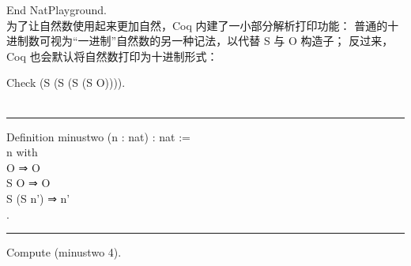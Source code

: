 \documentclass[utf8]{ctexart}
\begin{document}
{End} {NatPlayground}.\\

为了让自然数使用起来更加自然，Coq 内建了一小部分解析打印功能：
普通的十进制数可视为``一进制''自然数的另一种记法，以代替 {{S}} 与 {{O}}
构造子； 反过来，Coq 也会默认将自然数打印为十进制形式：

{Check} ({S} ({S} ({S} ({S} {O})))).\\
\hspace*{0.333em}\hspace*{0.333em}{(*~===\textgreater~4~:~nat~*)}\\

\begin{center}\rule{0.5\linewidth}{\linethickness}\end{center}

{Definition} {minustwo} ({n} : {nat}) : {nat} :=\\
\hspace*{0.333em}\hspace*{0.333em}{match} {n} {with}\\
\hspace*{0.333em}\hspace*{0.333em}\hspace*{0.333em}\hspace*{0.333em}\textbar{}
{O} ⇒ {O}\\
\hspace*{0.333em}\hspace*{0.333em}\hspace*{0.333em}\hspace*{0.333em}\textbar{}
{S} {O} ⇒ {O}\\
\hspace*{0.333em}\hspace*{0.333em}\hspace*{0.333em}\hspace*{0.333em}\textbar{}
{S} ({S} {n'}) ⇒ {n'}\\
\hspace*{0.333em}\hspace*{0.333em}{end}.\\

\begin{center}\rule{0.5\linewidth}{\linethickness}\end{center}

{Compute} ({minustwo} 4).\\
\hspace*{0.333em}\hspace*{0.333em}{(*~===\textgreater~2~:~nat~*)}\\
\end{document}
